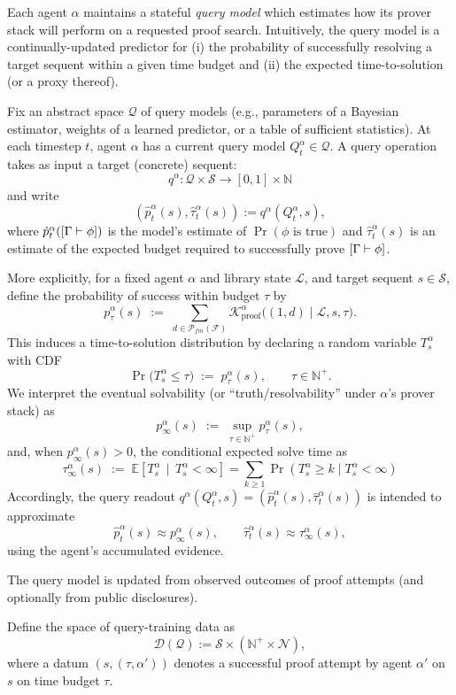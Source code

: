 Each agent $\alpha$ maintains a stateful \emph{query model} which estimates how its prover stack will perform on a
requested proof search. Intuitively, the query model is a continually-updated predictor for
(i) the probability of successfully resolving a target sequent within a given time budget and
(ii) the expected time-to-solution (or a proxy thereof).


Fix an abstract space $\mathcal{Q}$ of query models (e.g., parameters of a Bayesian estimator, weights of a learned predictor, or a table of sufficient statistics). At each timestep $t$, agent $\alpha$ has a current query model $Q_t^\alpha \in \mathcal{Q}$.
A query operation takes as input a target (concrete) sequent:
\[
q^\alpha : \mathcal{Q}\times \mathcal{S} \to [0,1]\times \mathbb{N}
\]
and write
\[
(\hat p_t^\alpha(s),\hat \tau_t^\alpha(s))
:=
q^\alpha(Q_t^\alpha,s),
\]
where $\hat p_t^\alpha([\Gamma \vdash \phi])$ is the model's estimate of $\Pr(\phi\text{ is true})$
and $\hat\tau_t^\alpha(s)$ is an estimate of the expected budget required to successfully prove $[\Gamma\vdash \phi]$. 

More explicitly, for a fixed agent $\alpha$ and library state $\mathcal{L}$, and target sequent $s\in\mathcal{S}$, define the probability of success within budget $\tau$ by
\[
p^\alpha_\tau(s) \;:=\; \sum_{d\in\mathcal{P}_{fin}(\mathcal{F})}\mathcal{K}^{\alpha}_{\mathrm{proof}}\big((1,d)\mid \mathcal L, s,\tau\big).
\]
This induces a time-to-solution distribution by declaring a random variable $T^\alpha_s$ with CDF
\[
\Pr\!\big(T^\alpha_s \le \tau\big) \;:=\; p^\alpha_\tau(s), \qquad \tau\in\mathbb{N}^+.
\]
We interpret the eventual solvability (or ``truth/resolvability'' under $\alpha$'s prover stack) as
\[
p^\alpha_\infty(s) \;:=\; \sup_{\tau\in\mathbb{N}^+} p^\alpha_\tau(s),
\]
and, when $p^\alpha_\infty(s)>0$, the conditional expected solve time as
\[
\tau^\alpha_\infty(s) \;:=\; \mathbb{E}\!\left[T^\alpha_s \,\middle|\, T^\alpha_s < \infty\right]=\sum_{k\ge1}\Pr(T^\alpha_s\ge k \mid T^\alpha_s<\infty)
\]
Accordingly, the query readout $q^\alpha(Q^\alpha_t,s)=(\hat p^\alpha_t(s),\hat\tau^\alpha_t(s))$ is intended to approximate
\[
\hat p^\alpha_t(s)\approx p^\alpha_\infty(s),
\qquad
\hat\tau^\alpha_t(s)\approx \tau^\alpha_\infty(s),
\]
using the agent's accumulated evidence.



The query model is updated from observed outcomes of proof attempts (and optionally from public disclosures).

Define the space of query-training data as
\[
\mathcal{D}(\mathcal{Q}) := \mathcal{S} \times (\mathbb{N}^+ \times \mathcal{N}),
\]
where a datum $(s,(\tau, \alpha'))$ denotes a successful proof attempt by agent $\alpha'$ on $s$ on time budget $\tau$.

